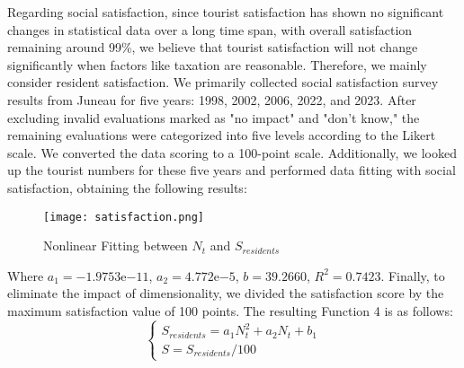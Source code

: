 \documentclass[12pt]{article}  %
\begin{document}
Regarding social satisfaction, since tourist satisfaction has shown no significant changes in statistical data over a long time span, with overall satisfaction remaining around 99\%, we believe that tourist satisfaction will not change significantly when factors like taxation are reasonable. Therefore, we mainly consider resident satisfaction.
We primarily collected social satisfaction survey results from Juneau for five years: 1998, 2002, 2006, 2022, and 2023\cite{4}. After excluding invalid evaluations marked as "no impact" and "don't know," the remaining evaluations were categorized into five levels according to the Likert scale. We converted the data scoring to a 100-point scale. Additionally, we looked up the tourist numbers for these five years\cite{5} and performed data fitting with social satisfaction, obtaining the following results:
\begin{figure}[H]
	\centering
	\texttt{[image: satisfaction.png]}
	\caption{Nonlinear Fitting between $N_t$ and $S_{residents}$}\label{fig:satisfaction}
\end{figure}
Where $a_1 = -1.9753 \mathrm{e}{-11}$, $a_2 = 4.772\mathrm{e}{-5}$, $b = 39.2660$, $R^2 = 0.7423$. Finally, to eliminate the impact of dimensionality, we divided the satisfaction score by the maximum satisfaction value of 100 points. The resulting Function 4 is as follows:
\begin{equation}
	\begin{cases}
		S_{residents}=a_{1}N_{t}^2+a_{2}N_{t} + b_{1} \\
		S=S_{residents}/100
	\end{cases}
\end{equation}
\end{document}
